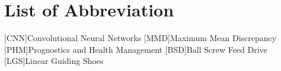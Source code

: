 
\chapter{List of Abbreviation}


\begin{acronym}[EuGH]
[CNN]{Convolutional Neural Networks}
[MMD]{Maximum Mean Discrepancy}
[PHM]{Prognostics and Health
Management}
[BSD]{Ball Screw Feed Drive}
[LGS]{Linear Guiding Shoes }
\end{acronym}